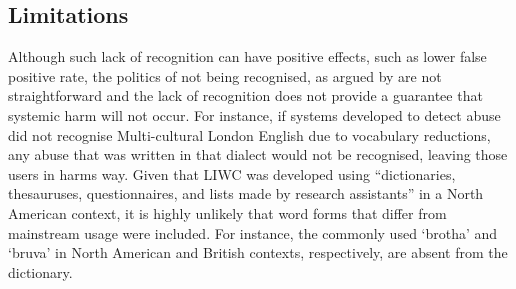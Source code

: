 \subsection{Limitations}
Although such lack of recognition can have positive effects, such as lower false positive rate, the politics of not being recognised, as argued by \citet{Benjamin:2019} are not straightforward and the lack of recognition does not provide a guarantee that systemic harm will not occur. For instance, if systems developed to detect abuse did not recognise Multi-cultural London English due to vocabulary reductions, any abuse that was written in that dialect would not be recognised, leaving those users in harms way. Given that LIWC was developed using ``dictionaries, thesauruses, questionnaires, and lists made by research assistants'' \citep{Tauscik:2010} in a North American context, it is highly unlikely that word forms that differ from mainstream usage were included. For instance, the commonly used `brotha' and `bruva' in North American and British contexts, respectively, are absent from the dictionary.
